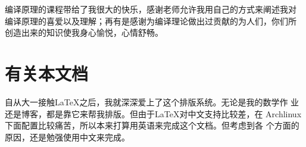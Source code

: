 \documentclass[12pt,leqno]{book}
\begin{document}
\begin{CJK}{UTF8}{gbsn}
编译原理的课程带给了我很大的快乐，感谢老师允许我用自己的方式来阐述我对
编译原理的喜爱以及理解；再有是感谢为编译理论做出过贡献的为人们，你们所
创造出来的知识使我身心愉悦，心情舒畅。

\section*{有关本文档}

自从大一接触\LaTeX{}之后，我就深深爱上了这个排版系统。无论是我的数学作
业还是博客，都是靠它来帮我排版。但由于\LaTeX{}对中文支持比较差，在
Archlinux下面配置比较痛苦，所以本来打算用英语来完成这个文档。但考虑到各
个方面的原因，还是勉强使用中文来完成。

\newpage

\pagestyle{headings}




\newpage
\end{CJK}
\end{document}
